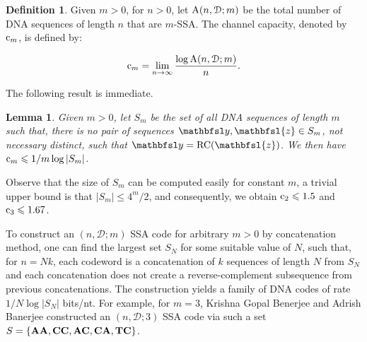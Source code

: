 \documentclass[conference]{IEEEtran}
\theoremstyle{plain}
\newtheorem{lemma}{Lemma}
\theoremstyle{definition}
\newtheorem{definition}{Definition}
\newcommand{\D}{{\mathcal D}}
\newcommand{\by}{{\mathbfsl y}}
\newcommand{\bz}{{\mathbfsl{z}}}
\renewcommand{\le}{\leqslant}
\begin{document}

\begin{definition} 
Given $m>0$, for $n>0$, let ${\rm A}(n,\D;m)$ be the total number of DNA sequences of length $n$ that are $m$-SSA. The channel capacity, denoted by ${\rm c}_m$, is defined by: 
\begin{small}
\begin{equation*} 
{\rm c}_m=\lim_{n \to \infty} \frac{\log {\rm A}(n,\D;m)}{n}.
\end{equation*}  
\end{small}
\end{definition}

The following result is immediate. 

\begin{lemma}\label{trivial-bound} 
Given $m>0$, let $S_m$ be the set of all DNA sequences of length $m$ such that, there is no pair of sequences $\by, \bz \in S_m$, not necessary distinct, such that $\by={\rm RC}(\bz)$. We then have ${\rm c}_m \le 1/m \log |S_m|$. 
\end{lemma}

Observe that the size of $S_m$ can be computed easily for constant $m$, a trivial upper bound is that $|S_m| \le 4^m/2$, and consequently, we obtain ${\rm c}_2 \le 1.5$ and ${\rm c}_3 \le 1.67$. 

To construct an $(n,\D;m)$ SSA code for arbitrary $m>0$ by concatenation method, one can find the largest set $S_N$ for some suitable value of $N$, such that, for $n=Nk$, each codeword is a concatenation of $k$ sequences of length $N$ from $S_N$ and each concatenation does not create a reverse-complement subsequence from previous concatenations. The construction yields a family of DNA codes of rate $1/N \log |S_N|$ bits/nt. For example, for $m=3$, Krishna Gopal Benerjee and Adrish Banerjee \cite{K:2021} constructed an $(n,\D;3)$ SSA code via such a set $S=\{{\bf A}{\bf A}, {\bf C}{\bf C}, {\bf A}{\bf C}, {\bf C}{\bf A},{\bf T}{\bf C}\}$. 

\end{document}
